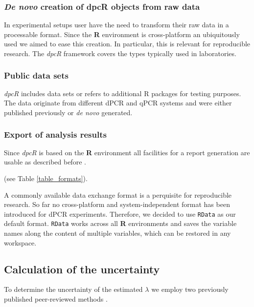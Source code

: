 \documentclass[a4,center,fleqn]{NAR}
\begin{document}
\subsubsection{\textit{De novo} creation of dpcR objects from raw data}

In experimental setups user have the need to transform their raw data in a 
processable format. Since the \textbf{R} environment is cross-platform an 
ubiquitously used we aimed to ease this creation. In particular, this is 
relevant for reproducible research. The \textit{dpcR} framework covers the types 
typically used in laboratories.

\subsubsection{Public data sets}

\textit{dpcR} includes data sets or refers to additional R packages for testing 
purposes. The data originate from different dPCR and qPCR systems and were 
either published previously \cite{whale_comparison_2012, roediger2015chippcr, 
white_digital_2009, rodiger_r_2015} or \textit{de novo} generated.

\subsubsection{Export of analysis results}

Since \textit{dpcR} is based on the \textbf{R} environment all facilities for a 
report generation are usable as described before \cite{rodiger_r_2015}.

(see Table \ref{table_formats}).

A commonly available data exchange format is a perquisite for reproducible 
research. So far no cross-platform and system-independent format has been 
introduced for dPCR experiments. Therefore, we decided to use \texttt{RData} as 
our default format. \texttt{RData} works across all \textbf{R} environments and 
saves the variable names along the content of multiple variables, which can be 
restored in any workspace.

\subsection{Calculation of the uncertainty}

To determine the uncertainty of the estimated $\lambda$ we employ two previously 
published peer-reviewed methods \cite{dube_mathematical_2008, bhat_single_2009}.
\end{document}
